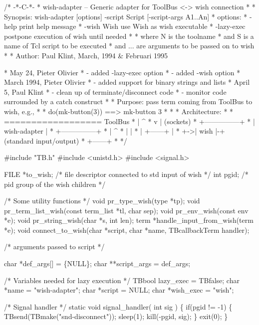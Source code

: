 \endmoddef\let\nwnotused=\nwoutput{}\nwstartdeflinemarkup\nwenddeflinemarkup
/* -*-C-*-
 * wish-adapter -- Generic adapter for ToolBus <-> wish connection
 *
 * Synopsis: wish-adapter [options] -script Script [-script-args A1..An]
 * options:
 *      -help                 print help message
 *      -wish Wish            use Wish as wish executable
 *      -lazy-exec            postpone execution of wish until needed
 *
 * where N is the toolname
 * and   S is a name of Tcl script to be executed
 * and   ... are arguments to be passed on to wish
 *
 * Author: Paul Klint, March, 1994 & Februari 1995

 * May 24, Pieter Olivier
 * - added -lazy-exec option
 * - added -wish option
 * March 1994, Pieter Olivier
 * - added support for binary strings and lists
 * April 5, Paul Klint
 * - clean up of terminate/disconnect code
 * - monitor code surrounded by a catch construct
 *
 * Purpose: pass term coming from ToolBus to wish, e.g.,
 *
 *    do(mk-button(3))  ==> mk-button 3
 *
 *
 * Architecture:
 *
 *         ================== ToolBus
 *           |           ^
 *           v           |    (sockets)
 *         +---------------+
 *         | wish-adapter  |
 *         +---------------+
 *           |           ^
 *           |           |
 *           |  +------+ |
 *           +->| wish |-+    (standard input/output)
 *              +------+
 *
 */

#include "TB.h"
#include <unistd.h>
#include <signal.h>

FILE *to_wish;  /* file descriptor connected to std input of wish */
int pgid;       /* pid group of the wish children */

/* Some utility functions */
void pr_type_wish(type *tp);
void pr_term_list_wish(const term_list *tl, char sep);
void pr_env_wish(const env *e);
void pr_string_wish(char *s, int len);
term *handle_input_from_wish(term *e);
void connect_to_wish(char *script, char *name, TBcallbackTerm handler);

/* arguments passed to script */

char *def_args[] = \{NULL\};
char **script_args = def_args;

/* Variables needed for lazy execution */
TBbool lazy_exec = TBfalse;
char *name = "wish-adapter";
char *script = NULL;
char *wish_exec = "wish";

/* Signal handler */
static void signal_handler( int sig )
\{
  if(pgid != -1) \{
    TBsend(TBmake("snd-disconnect"));
    sleep(1);
    kill(-pgid, sig);
  \}
  exit(0);
\}

